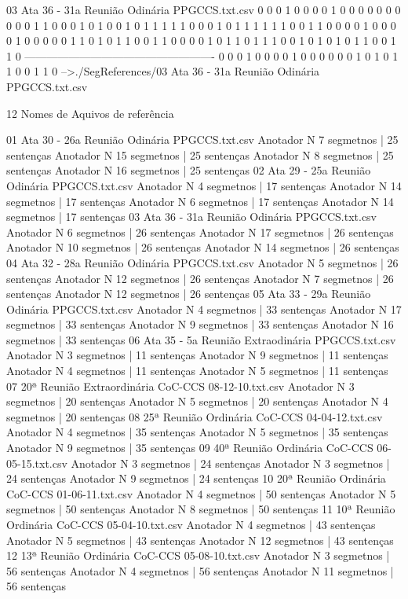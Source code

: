 	03 Ata 36 - 31a Reunião Odinária PPGCCS.txt.csv
	0 0 0 1 0 0 0 0 1 0 0 0 0 0 0 0 0 0 0 1 1 0 0 0 1 0 
	1 0 0 1 0 1 1 1 1 1 0 0 0 1 0 1 1 1 1 1 1 0 0 1 1 0 
	0 0 0 1 0 0 0 0 1 0 0 0 0 0 1 1 0 1 0 1 1 0 0 1 1 0 
	0 0 0 1 0 1 1 0 1 1 1 0 0 1 0 1 0 1 0 1 1 0 0 1 1 0 
	----------------------------------------------------
	0 0 0 1 0 0 0 0 1 0 0 0 0 0 0 1 0 1 0 1 1 0 0 1 1 0 
	-->./SegReferences/03 Ata 36 - 31a Reunião Odinária PPGCCS.txt.csv





12 Nomes de Aquivos de referência

01 Ata 30 - 26a Reunião Odinária PPGCCS.txt.csv
	Anotador N   7 segmetnos |  25 sentenças
	Anotador N  15 segmetnos |  25 sentenças
	Anotador N   8 segmetnos |  25 sentenças
	Anotador N  16 segmetnos |  25 sentenças
02 Ata 29 - 25a Reunião Odinária PPGCCS.txt.csv
	Anotador N   4 segmetnos |  17 sentenças
	Anotador N  14 segmetnos |  17 sentenças
	Anotador N   6 segmetnos |  17 sentenças
	Anotador N  14 segmetnos |  17 sentenças
03 Ata 36 - 31a Reunião Odinária PPGCCS.txt.csv
	Anotador N   6 segmetnos |  26 sentenças
	Anotador N  17 segmetnos |  26 sentenças
	Anotador N  10 segmetnos |  26 sentenças
	Anotador N  14 segmetnos |  26 sentenças
04 Ata 32 - 28a Reunião Odinária PPGCCS.txt.csv
	Anotador N   5 segmetnos |  26 sentenças
	Anotador N  12 segmetnos |  26 sentenças
	Anotador N   7 segmetnos |  26 sentenças
	Anotador N  12 segmetnos |  26 sentenças
05 Ata 33 - 29a Reunião Odinária PPGCCS.txt.csv
	Anotador N   4 segmetnos |  33 sentenças
	Anotador N  17 segmetnos |  33 sentenças
	Anotador N   9 segmetnos |  33 sentenças
	Anotador N  16 segmetnos |  33 sentenças
06 Ata 35 - 5a Reunião Extraodinária PPGCCS.txt.csv
	Anotador N   3 segmetnos |  11 sentenças
	Anotador N   9 segmetnos |  11 sentenças
	Anotador N   4 segmetnos |  11 sentenças
	Anotador N   5 segmetnos |  11 sentenças
07 20ª Reunião Extraordinária CoC-CCS 08-12-10.txt.csv
	Anotador N   3 segmetnos |  20 sentenças
	Anotador N   5 segmetnos |  20 sentenças
	Anotador N   4 segmetnos |  20 sentenças
08 25ª Reunião Ordinária CoC-CCS 04-04-12.txt.csv
	Anotador N   4 segmetnos |  35 sentenças
	Anotador N   5 segmetnos |  35 sentenças
	Anotador N   9 segmetnos |  35 sentenças
09 40ª Reunião Ordinária CoC-CCS 06-05-15.txt.csv
	Anotador N   3 segmetnos |  24 sentenças
	Anotador N   3 segmetnos |  24 sentenças
	Anotador N   9 segmetnos |  24 sentenças
10 20ª Reunião Ordinária CoC-CCS 01-06-11.txt.csv
	Anotador N   4 segmetnos |  50 sentenças
	Anotador N   5 segmetnos |  50 sentenças
	Anotador N   8 segmetnos |  50 sentenças
11 10ª Reunião Ordinária CoC-CCS 05-04-10.txt.csv
	Anotador N   4 segmetnos |  43 sentenças
	Anotador N   5 segmetnos |  43 sentenças
	Anotador N  12 segmetnos |  43 sentenças
12 13ª Reunião Ordinária CoC-CCS 05-08-10.txt.csv
	Anotador N   3 segmetnos |  56 sentenças
	Anotador N   4 segmetnos |  56 sentenças
	Anotador N  11 segmetnos |  56 sentenças


